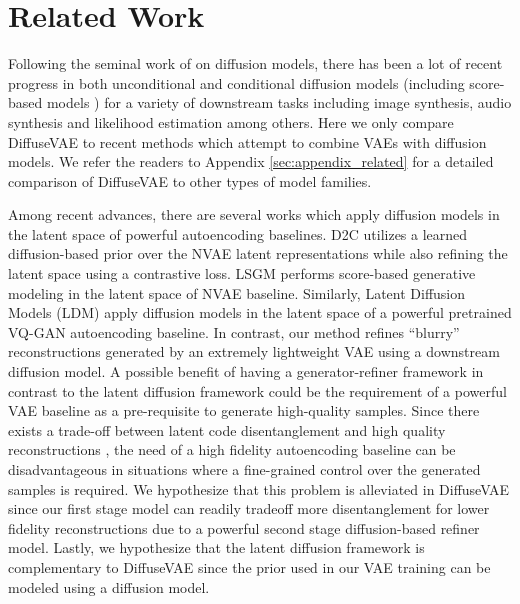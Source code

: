 \documentclass[10pt]{article} \usepackage[accepted]{tmlr}
\begin{document}
\section{Related Work}

Following the seminal work of \citep{sohldickstein2015deep, ho2020denoising} on diffusion models, there has been a lot of recent progress in both unconditional \citep{nichol2021improved, dhariwal2021diffusion, kingma2021variational} and conditional diffusion models \citep{ho2021cascaded, saharia2021image, choi2021ilvr, chen2020wavegrad} (including score-based models \citep{song2021scorebased, song2020generative}) for a variety of downstream tasks including image synthesis, audio synthesis and likelihood estimation among others. Here we only compare DiffuseVAE to recent methods which attempt to combine VAEs with diffusion models. We refer the readers to Appendix \ref{sec:appendix_related} for a detailed comparison of DiffuseVAE to other types of model families.

Among recent advances, there are several works which apply diffusion models in the latent space of powerful autoencoding baselines. D2C \citep{sinha2021d2c} utilizes a learned diffusion-based prior over the NVAE \citep{vahdat2021nvae} latent representations while also refining the latent space using a contrastive loss. LSGM \citep{vahdat2021scorebased} performs score-based generative modeling in the latent space of NVAE baseline. Similarly, Latent Diffusion Models (LDM) \citep{rombach2021highresolution} apply diffusion models in the latent space of a powerful pretrained VQ-GAN \citep{https://doi.org/10.48550/arxiv.2012.09841} autoencoding baseline. In contrast, our method refines “blurry” reconstructions generated by an extremely lightweight VAE using a downstream diffusion model. A possible benefit of having a generator-refiner framework in contrast to the latent diffusion framework could be the requirement of a powerful VAE baseline as a pre-requisite to generate high-quality samples. Since there exists a trade-off between latent code disentanglement and high quality reconstructions \citep{Higgins2017betaVAELB}, the need of a high fidelity autoencoding baseline can be disadvantageous in situations where a fine-grained control over the generated samples is required. We hypothesize that this problem is alleviated in DiffuseVAE since our first stage model can readily tradeoff more disentanglement for lower fidelity reconstructions due to a powerful second stage diffusion-based refiner model. Lastly, we hypothesize that the latent diffusion framework is complementary to DiffuseVAE since the prior used in our VAE training can be modeled using a diffusion model.
\end{document}
